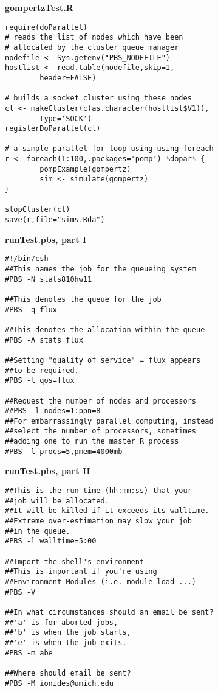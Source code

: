 \documentclass[portrait,11pt]{seminar}
\begin{document}
\bs
{\bf{gompertzTest.R}}

\begin{verbatim}
require(doParallel)
# reads the list of nodes which have been 
# allocated by the cluster queue manager
nodefile <- Sys.getenv("PBS_NODEFILE")
hostlist <- read.table(nodefile,skip=1,
        header=FALSE)
 
# builds a socket cluster using these nodes
cl <- makeCluster(c(as.character(hostlist$V1)), 
        type='SOCK')
registerDoParallel(cl)

# a simple parallel for loop using using foreach
r <- foreach(1:100,.packages='pomp') %dopar% {
        pompExample(gompertz)
        sim <- simulate(gompertz)
}

stopCluster(cl)
save(r,file="sims.Rda")
\end{verbatim}
\es

\bs
{\bf runTest.pbs, part I}

\begin{verbatim}
#!/bin/csh
##This names the job for the queueing system
#PBS -N stats810hw11

##This denotes the queue for the job
#PBS -q flux

##This denotes the allocation within the queue
#PBS -A stats_flux

##Setting "quality of service" = flux appears 
##to be required.
#PBS -l qos=flux

##Request the number of nodes and processors
##PBS -l nodes=1:ppn=8 
##For embarrassingly parallel computing, instead 
##select the number of processors, sometimes 
##adding one to run the master R process
#PBS -l procs=5,pmem=4000mb
\end{verbatim}
\es

\bs
{\bf runTest.pbs, part II}

\begin{verbatim}
##This is the run time (hh:mm:ss) that your 
##job will be allocated.  
##It will be killed if it exceeds its walltime.
##Extreme over-estimation may slow your job
##in the queue.
#PBS -l walltime=5:00

##Import the shell's environment
##This is important if you're using 
##Environment Modules (i.e. module load ...)
#PBS -V

##In what circumstances should an email be sent?
##'a' is for aborted jobs,
##'b' is when the job starts, 
##'e' is when the job exits.
#PBS -m abe

##Where should email be sent?
#PBS -M ionides@umich.edu
\end{verbatim}
\es
\end{document}
